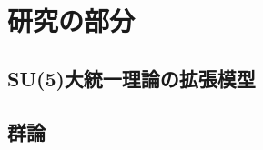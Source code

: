 \documentclass[uplatex,dvipdfmx,a4paper,titlepage]{jsbook}
\theoremstyle{plain}
\theoremstyle{definition}
\begin{document}
\part{研究の部分}

\chapter{SU(5)大統一理論の拡張模型}


\appendix
\chapter{群論}




\end{document}

